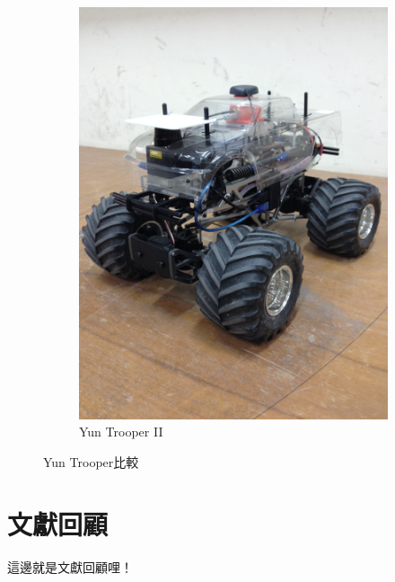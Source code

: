 \begin{figure}[h!]
\begin{subfigure}[b]{0.45\textwidth}
		\includegraphics[width=\textwidth]{figures/YunTrooperII.jpg}
		\caption{Yun Trooper II}
		\label{fig:YunTrooperII}
	\end{subfigure}
	\caption{Yun Trooper比較}
\end{figure}

\section{文獻回顧}
這邊就是文獻回顧哩！

